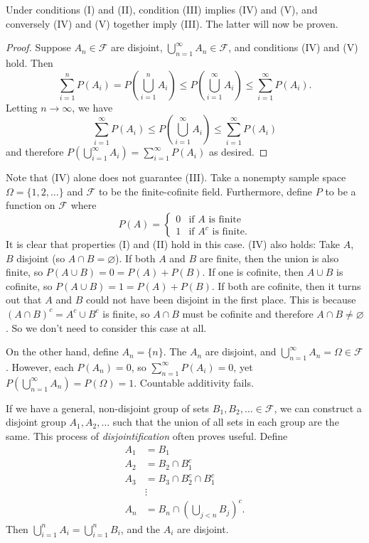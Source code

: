 \documentclass[11pt,fleqn]{book} %
\begin{document}
Under conditions (I) and (II), condition (III) implies (IV) and (V), and conversely (IV) and (V) together imply (III). The latter will now be proven.

\begin{proof}
	Suppose $A_n \in \mathcal{F}$ are disjoint, $\bigcup_{n=1}^\infty A_n \in \mathcal{F}$, and conditions (IV) and (V) hold. Then
	\[
		\sum_{i=1}^n P(A_i) = P \left( \bigcup_{i=1}^n A_i \right) \leq P \left( \bigcup_{i=1}^\infty A_i \right) \leq \sum_{i=1}^\infty P(A_i).
	\]
	Letting $n \rightarrow \infty$, we have
	\[
		\sum_{i=1}^\infty P(A_i) \leq P \left( \bigcup_{i=1}^\infty A_i \right) \leq \sum_{i=1}^\infty P(A_i)
	\]
	and therefore $P \left( \bigcup_{i=1}^\infty A_i \right) = \sum_{i=1}^\infty P(A_i)$ as desired.
\end{proof}

Note that (IV) alone does not guarantee (III). Take a nonempty sample space $\Omega = \{1,2,\dots\}$ and $\mathcal{F}$ to be the finite-cofinite field. Furthermore, define $P$ to be a function on $\mathcal{F}$ where
\[
	P(A) = \begin{cases}
		0 & \textrm{if } A \textrm{ is finite} \\
		1 & \textrm{if } A^c \textrm{ is finite}.
	\end{cases}
\]
It is clear that properties (I) and (II) hold in this case. (IV) also holds: Take $A$, $B$ disjoint (so $A \cap B = \varnothing$). If both $A$ and $B$ are finite, then the union is also finite, so $P(A \cup B) = 0 = P(A) + P(B)$. If one is cofinite, then $A \cup B$ is cofinite, so $P(A \cup B) = 1 = P(A) + P(B)$. If both are cofinite, then it turns out that $A$ and $B$ could not have been disjoint in the first place. This is because $(A \cap B)^c = A^c \cup B^c$ is finite, so $A \cap B$ must be cofinite and therefore $A \cap B \neq \varnothing$. So we don't need to consider this case at all.

On the other hand, define $A_n = \{n\}$. The $A_n$ are disjoint, and $\bigcup_{n=1}^\infty A_n = \Omega \in \mathcal{F}$. However, each $P(A_n) = 0$, so $\sum_{n=1}^\infty P(A_i) = 0$, yet $P(\bigcup_{n=1}^\infty A_n) = P(\Omega) = 1$. Countable additivity fails.

\begin{remark}
	If we have a general, non-disjoint group of sets $B_1,B_2,\dots \in \mathcal{F}$, we can construct a disjoint group $A_1,A_2,\dots$ such that the union of all sets in each group are the same. This process of \emph{disjointification} often proves useful. Define
	\begin{align*}
		A_1 &= B_1 \\
		A_2 &= B_2 \cap B_1^c \\
		A_3 &= B_3 \cap B_2^c \cap B_1^c \\
		&\vdots \\
		A_n &= B_n \cap \left( \bigcup_{j < n} B_j \right)^c.
	\end{align*}
	Then $\bigcup_{i=1}^n A_i = \bigcup_{i=1}^n B_i$, and the $A_i$ are disjoint.
\end{remark}
\end{document}
